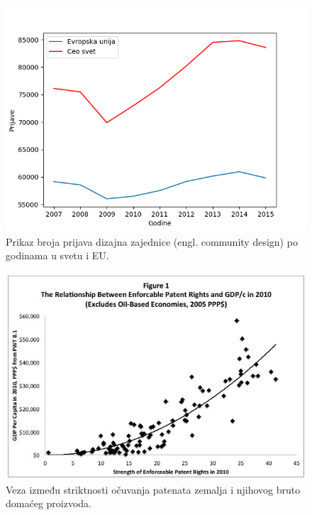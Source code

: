 \documentclass[a4paper]{article}
\begin{document}
\newpage

\begin{figure}
\begin{center}
\includegraphics[scale=0.6]{eu_vs_cs.png}
\end{center}
\caption{Prikaz broja prijava dizajna zajednice (engl. community design) po godinama u svetu i EU.}
\end{figure}

\begin{figure}
\begin{center}
\includegraphics[scale=0.6]{patents_and_gdp.jpg}
\end{center}
\caption{Veza između striktnosti očuvanja patenata zemalja i njihovog bruto domaćeg proizvoda.}
\label{fig:pat_gdp}
\end{figure}
\FloatBarrier
\end{document}

